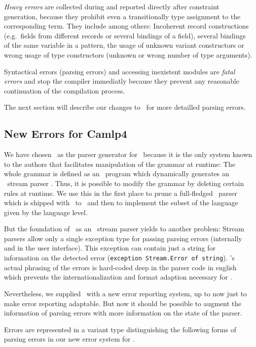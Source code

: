 \emph{Heavy errors} are collected during and reported directly after constraint
generation, because they prohibit even a transitionally type assignment 
to the corresponding term. They include among others:
Incoherent record constructions (e.g.\ fields from different records or several
bindings of a field), several bindings of the same variable in a pattern, the usage of
unknown variant constructors or wrong usage of type constructors (unknown or
wrong number of type arguments).

Syntactical errors (parsing errors) and accessing inexistent modules are
\emph{fatal errors} and stop the compiler immediatly because they prevent
any reasonable continuation of the compilation process.

The next section will describe our changes to \camlpf\ for more detailled
parsing errors.

\subsection{New Errors for Camlp4}

We have chosen \camlpf\ as the parser generator for \easyocaml\ because it is
the only system known to the authors that facilitates manipulation of the
grammar at runtime: The whole grammar is defined as an \ocaml\ program which
dynamically generates an \ocaml\ stream parser \citep{ocamlstreamparser}. Thus,
it is possible to modify the grammar by deleting certain rules at runtime. We
use this in the first place to prune a full-fledged \ocaml\ parser which is
shipped with \camlpf\ to \camlm\ and then to implement the subset of the
language given by the language level.

But the foundation of \camlpf\ as an \ocaml\ stream parser yields to another
problem: Stream parsers allow only a single exception type for passing parsing
errors (internally and in the user interface). This exception can contain
just a string for information on the detected error (\texttt{exception
Stream.Error of string}). \camlpf's actual phrasing of the errors is hard-coded
deep in the parser code in english which prevents the internationalization and
format adaption necessary for \easyocaml.


Nevertheless, we supplied \camlpf\ with a new error reporting system, up 
to now just to make error reporting adaptable. But now it should be possible to
augment the information of parsing errors with more information on the state of
the parser.

Errors are represented in a variant type distinguishing the following forms of
parsing errors in our new error system for \camlpf.

